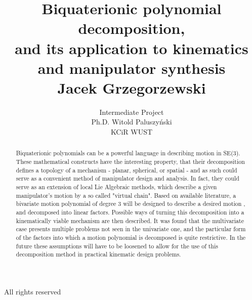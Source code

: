 \documentclass{report}
\title{\huge{Biquaterionic polynomial decomposition,\\
and its application to kinematics and manipulator synthesis}\\
Jacek Grzegorzewski}
\author{\Huge{Intermediate Project}\\ Ph.D. Witold Paluszyński\\ KCiR WUST}
\begin{document}
\begin{minipage}[h!]{0.8\textwidth}
    \maketitle
\begin{abstract}
Biquaterionic polynomials can be a powerful language in describing motion in SE(3). These mathematical constructs have the interesting property, that
their decomposition defines a topology of a mechanism - planar, spherical, or spatial - and as such could serve as a convenient method of manipulator design and analysis. In fact, they could serve as an extension of local Lie Algebraic methods, which describe a given manipulator's motion by a so called "virtual chain". Based on available literature, a bivariate motion polynomial of degree 3 will be designed to describe a desired motion , and decomposed into linear factors. Possible ways of turning this decomposition into a kinematically viable mechanism are then described. It was found that the multivariate case presents multiple problems not seen in the univariate one, and the particular form of the factors into which a motion polynomial is decomposed is quite restrictive. In the future these assumptions will have to be loosened to allow for the use of this decomposition method in practical kinematic design problems.
\end{abstract}
\vspace*{\fill}
\begin{flushright}
\Huge{All rights reserved \textcopyright}
\end{flushright}
\end{minipage}


\cleardoublepage
\pagebreak

%
%
%
%

\printbibliography %
\end{document}
